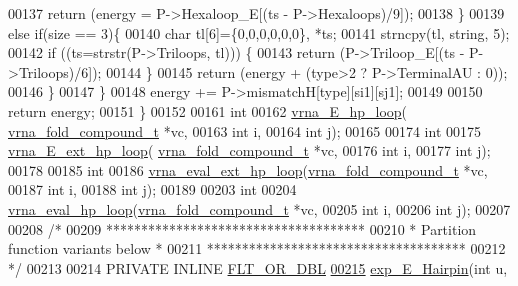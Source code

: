 \begin{DoxyCode}
00137         \textcolor{keywordflow}{return} (energy = P->Hexaloop\_E[(ts - P->Hexaloops)/9]);
00138     \}
00139     \textcolor{keywordflow}{else} \textcolor{keywordflow}{if}(size == 3)\{
00140       \textcolor{keywordtype}{char} tl[6]=\{0,0,0,0,0,0\}, *ts;
00141       strncpy(tl, \textcolor{keywordtype}{string}, 5);
00142       \textcolor{keywordflow}{if} ((ts=strstr(P->Triloops, tl))) \{
00143         \textcolor{keywordflow}{return} (P->Triloop\_E[(ts - P->Triloops)/6]);
00144       \}
00145       \textcolor{keywordflow}{return} (energy + (type>2 ? P->TerminalAU : 0));
00146     \}
00147   \}
00148   energy += P->mismatchH[type][si1][sj1];
00149 
00150   \textcolor{keywordflow}{return} energy;
00151 \}
00152 
00161 \textcolor{keywordtype}{int}
00162 \hyperlink{group__loops_ga999ba163a8148d72fd5f22819a681df7}{vrna\_E\_hp\_loop}( \hyperlink{group__fold__compound_structvrna__fc__s}{vrna\_fold\_compound\_t} *vc,
00163                 \textcolor{keywordtype}{int} i,
00164                 \textcolor{keywordtype}{int} j);
00165 
00174 \textcolor{keywordtype}{int}
00175 \hyperlink{group__loops_gac3393ee309372eccae944e3a07f455f9}{vrna\_E\_ext\_hp\_loop}( \hyperlink{group__fold__compound_structvrna__fc__s}{vrna\_fold\_compound\_t} *vc,
00176                     \textcolor{keywordtype}{int} i,
00177                     \textcolor{keywordtype}{int} j);
00178 
00185 \textcolor{keywordtype}{int}
00186 \hyperlink{group__eval_gad3b92453a6b501856eec8fae39f3235d}{vrna\_eval\_ext\_hp\_loop}(\hyperlink{group__fold__compound_structvrna__fc__s}{vrna\_fold\_compound\_t} *vc,
00187                       \textcolor{keywordtype}{int} i,
00188                       \textcolor{keywordtype}{int} j);
00189 
00203 \textcolor{keywordtype}{int}
00204 \hyperlink{group__eval_gab3eb4651dc26dc2b653a57dd340d7e68}{vrna\_eval\_hp\_loop}(\hyperlink{group__fold__compound_structvrna__fc__s}{vrna\_fold\_compound\_t} *vc,
00205                   \textcolor{keywordtype}{int} i,
00206                   \textcolor{keywordtype}{int} j);
00207 
00208 \textcolor{comment}{/*}
00209 \textcolor{comment}{*************************************}
00210 \textcolor{comment}{* Partition function variants below *}
00211 \textcolor{comment}{*************************************}
00212 \textcolor{comment}{*/}
00213 
00214 PRIVATE INLINE \hyperlink{group__data__structures_ga31125aeace516926bf7f251f759b6126}{FLT\_OR\_DBL}
\hypertarget{hairpin__loops_8h_source_l00215}{}\hyperlink{group__loops_ga51fb555974f180b78d76142b2894851c}{00215} \hyperlink{group__loops_ga51fb555974f180b78d76142b2894851c}{exp\_E\_Hairpin}(\textcolor{keywordtype}{int} u,

\end{DoxyCode}
